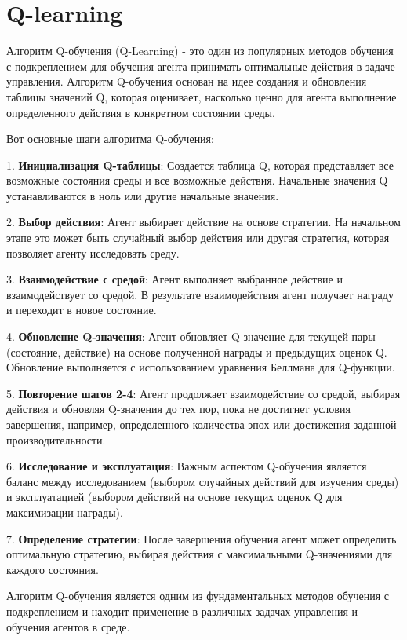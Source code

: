 \section{Q-learning}
Алгоритм Q-обучения (Q-Learning) - это один из популярных методов обучения с подкреплением для обучения агента принимать оптимальные действия в задаче управления. Алгоритм Q-обучения основан на идее создания и обновления таблицы значений Q, которая оценивает, насколько ценно для агента выполнение определенного действия в конкретном состоянии среды.

Вот основные шаги алгоритма Q-обучения:

1. \textbf{Инициализация Q-таблицы}: Создается таблица Q, которая представляет все возможные состояния среды и все возможные действия. Начальные значения Q устанавливаются в ноль или другие начальные значения.

2. \textbf{Выбор действия}: Агент выбирает действие на основе стратегии. На начальном этапе это может быть случайный выбор действия или другая стратегия, которая позволяет агенту исследовать среду.

3. \textbf{Взаимодействие с средой}: Агент выполняет выбранное действие и взаимодействует со средой. В результате взаимодействия агент получает награду и переходит в новое состояние.

4. \textbf{Обновление Q-значения}: Агент обновляет Q-значение для текущей пары (состояние, действие) на основе полученной награды и предыдущих оценок Q. Обновление выполняется с использованием уравнения Беллмана для Q-функции.

5. \textbf{Повторение шагов 2-4}: Агент продолжает взаимодействие со средой, выбирая действия и обновляя Q-значения до тех пор, пока не достигнет условия завершения, например, определенного количества эпох или достижения заданной производительности.

6. \textbf{Исследование и эксплуатация}: Важным аспектом Q-обучения является баланс между исследованием (выбором случайных действий для изучения среды) и эксплуатацией (выбором действий на основе текущих оценок Q для максимизации награды).

7. \textbf{Определение стратегии}: После завершения обучения агент может определить оптимальную стратегию, выбирая действия с максимальными Q-значениями для каждого состояния.

Алгоритм Q-обучения является одним из фундаментальных методов обучения с подкреплением и находит применение в различных задачах управления и обучения агентов в среде.
